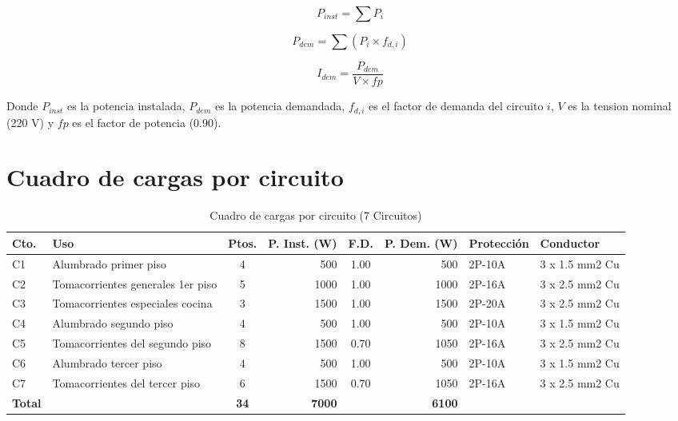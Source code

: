 \begin{equation}
P_{inst} = \sum P_i
\end{equation}

\begin{equation}
P_{dem} = \sum (P_i \times f_{d,i})
\end{equation}

\begin{equation}
I_{dem} = \frac{P_{dem}}{V \times fp}
\end{equation}

Donde $P_{inst}$ es la potencia instalada, $P_{dem}$ es la potencia demandada, $f_{d,i}$ es el factor de demanda del circuito $i$, $V$ es la tension nominal (220 V) y $fp$ es el factor de potencia (0.90).

\section{Cuadro de cargas por circuito}

\begin{table}[H]
\centering
\small
\setlength{\tabcolsep}{3pt}
\caption{Cuadro de cargas por circuito (7 Circuitos)}
\label{tab:cuadro-cargas-circuito}
\begin{tabularx}{\textwidth}{l Y c r c r Y Y}
\toprule
\textbf{Cto.} & \textbf{Uso} & \textbf{Ptos.} & \textbf{P. Inst. (W)} & \textbf{F.D.} & \textbf{P. Dem. (W)} & \textbf{Protección} & \textbf{Conductor} \\
\midrule
C1 & Alumbrado primer piso & 4 & 500 & 1.00 & 500 & 2P-10A & 3 x 1.5 mm2 Cu \\
C2 & Tomacorrientes generales 1er piso & 5 & 1000 & 1.00 & 1000 & 2P-16A & 3 x 2.5 mm2 Cu \\
C3 & Tomacorrientes especiales cocina & 3 & 1500 & 1.00 & 1500 & 2P-20A & 3 x 2.5 mm2 Cu \\
C4 & Alumbrado segundo piso & 4 & 500 & 1.00 & 500 & 2P-10A & 3 x 1.5 mm2 Cu \\
C5 & Tomacorrientes del segundo piso & 8 & 1500 & 0.70 & 1050 & 2P-16A & 3 x 2.5 mm2 Cu \\
C6 & Alumbrado tercer piso & 4 & 500 & 1.00 & 500 & 2P-10A & 3 x 1.5 mm2 Cu \\
C7 & Tomacorrientes del tercer piso & 6 & 1500 & 0.70 & 1050 & 2P-16A & 3 x 2.5 mm2 Cu \\
\textbf{Total} &  & \textbf{34} & \textbf{7000} &  & \textbf{6100} &  &  \\
\bottomrule
\end{tabularx}
\end{table}

